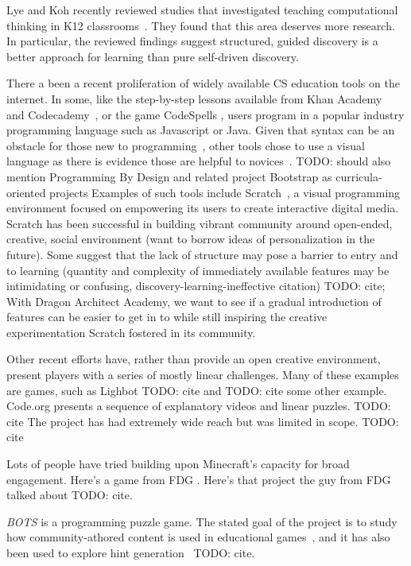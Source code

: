 \documentclass{sig-alternate}
\newcommand{\TODO}[1]{{\color{red} TODO: #1}}
\newcommand{\gametitle}{{\color{RoyalPurple} Dragon Architect Academy}}
\begin{document}
Lye and Koh recently reviewed studies that investigated teaching computational thinking in K12 classrooms~\cite{lye2014review}.
They found that this area deserves more research.
In particular, the reviewed findings suggest structured, guided discovery is a better approach for learning than pure self-driven discovery.

There a been a recent proliferation of widely available CS education tools on the internet.
In some, like the step-by-step lessons available from Khan Academy~\cite{khanacademy} and Codecademy~\cite{codecademy}, or the game CodeSpells \cite{esper2013codespells}, users program in a popular industry programming language such as Javascript or Java.
Given that syntax can be an obstacle for those new to programming~\cite{stefik2013syntax}, other tools chose to use a visual language as there is evidence those are helpful to novices~\cite{whitley1997visual}.
\TODO{should also mention Programming By Design and related project Bootstrap as curricula-oriented projects}
Examples of such tools include Scratch~\cite{maloney2010scratch}, a visual programming environment focused on empowering its users to create interactive digital media.
Scratch has been successful in building vibrant community around open-ended, creative, social environment (want to borrow ideas of personalization in the future).
Some suggest that the lack of structure may pose a barrier to entry and to learning (quantity and complexity of immediately available features may be intimidating or confusing, discovery-learning-ineffective citation) \TODO{cite};
With \gametitle{}, we want to see if a gradual introduction of features can be easier to get in to while still inspiring the creative experimentation Scratch fostered in its community.

Other recent efforts have, rather than provide an open creative environment, present players with a series of mostly linear challenges.
Many of these examples are games, such as Lighbot \TODO{cite} and \TODO{cite some other example}.
Code.org presents a sequence of explanatory videos and linear puzzles. \TODO{cite}
The project has had extremely wide reach but was limited in scope. \TODO{cite}

Lots of people have tried building upon Minecraft's capacity for broad engagement.
Here's a game from FDG \cite{zorn2013minecraft}.
Here's that project the guy from FDG talked about \TODO{cite}.

\emph{BOTS} is a programming puzzle game. The stated goal of the project is to study how community-athored content is used in educational games~\cite{hickspart14}, and it has also been used to explore hint generation~\TODO{cite}.
\end{document}
